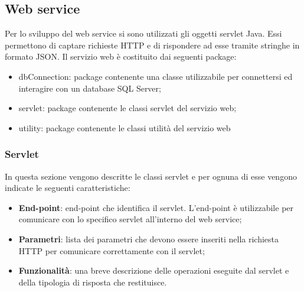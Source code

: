 \documentclass[12pt, a4paper, titlepage]{report}
\begin{document}
	\subsection{Web service}
	
	Per lo sviluppo del web service si sono utilizzati gli oggetti servlet Java. Essi permettono di captare richieste HTTP e di rispondere ad esse tramite stringhe in formato JSON. Il servizio web è costituito dai seguenti package:
	\begin{itemize}
		\item dbConnection: package contenente una classe utilizzabile per connettersi ed interagire con un database SQL Server;
		\item servlet: package contenente le classi servlet del servizio web;
		\item utility: package contenente le classi utilità del servizio web
	\end{itemize}

	\subsubsection{Servlet}
	
	In questa sezione vengono descritte le classi servlet e per ognuna di esse vengono indicate le seguenti caratteristiche:
	\begin{itemize}
		\item \textbf{End-point}: end-point che identifica il servlet. L'end-point è utilizzabile per comunicare con lo specifico servlet all'interno del web service;
		\item \textbf{Parametri}: lista dei parametri che devono essere inseriti nella richiesta HTTP per comunicare correttamente con il servlet;
		\item \textbf{Funzionalità}: una breve descrizione delle operazioni eseguite dal servlet e della tipologia di risposta che restituisce.
	\end{itemize}
\end{document}
